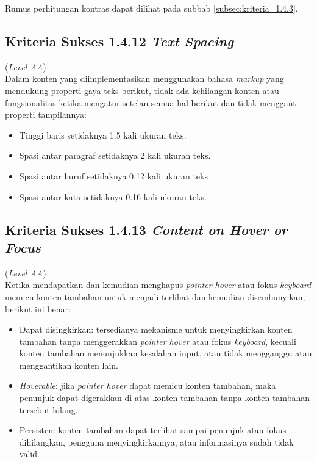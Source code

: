 Rumus perhitungan kontras dapat dilihat pada subbab \ref{subsec:kriteria_1.4.3}.

\subsection{Kriteria Sukses 1.4.12 \textit{Text Spacing}}
\label{subsec:kriteria_1.4.12}
(\textit{Level AA}) \\

Dalam konten yang diimplementasikan menggunakan bahasa \textit{markup} yang mendukung properti gaya teks berikut, tidak ada kehilangan konten atau fungsionalitas ketika mengatur setelan semua hal berikut dan tidak mengganti properti tampilannya: 

\begin{itemize}
	\item Tinggi baris setidaknya 1.5 kali ukuran teks.
	\item Spasi antar paragraf setidaknya 2 kali ukuran teks.
	\item Spasi antar huruf setidaknya 0.12 kali ukuran teks
	\item Spasi antar kata setidaknya 0.16 kali ukuran teks.
\end{itemize}

\subsection{Kriteria Sukses 1.4.13 \textit{Content on Hover or Focus}}
\label{subsec:kriteria_1.4.13}
(\textit{Level AA}) \\

Ketika mendapatkan dan kemudian menghapus \textit{pointer hover} atau fokus \textit{keyboard} memicu konten tambahan untuk menjadi terlihat dan kemudian disembunyikan, berikut ini benar:

\begin{itemize}
	\item Dapat disingkirkan: tersedianya mekanisme untuk menyingkirkan konten tambahan tanpa menggerakkan \textit{pointer hover} atau fokus \textit{keyboard}, kecuali konten tambahan menunjukkan kesalahan input, atau tidak mengganggu atau menggantikan konten lain.
	\item \textit{Hoverable}: jika \textit{pointer hover} dapat memicu konten tambahan, maka penunjuk dapat digerakkan di atas konten tambahan tanpa konten tambahan tersebut hilang.
	\item Persisten: konten tambahan dapat terlihat sampai penunjuk atau fokus dihilangkan, pengguna menyingkirkannya, atau informasinya sudah tidak valid.
\end{itemize}


